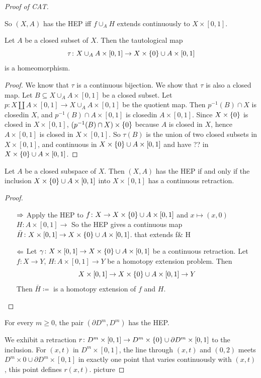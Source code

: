 \documentclass{TemplateLecture}
\begin{document}
\begin{proof}[Proof of CAT]
\begin{proposition}
        So \((X,A)\) has the HEP iff \(f\cup_A H\) extends continuously to \(X\times [0,1]\).
    \end{proposition}
    \begin{lem}
        Let \(A\) be a closed subset of \(X\). Then the tautological map
        \[\tau\colon X\cup_A A\times [0,1] \to X \times \{0\} \cup A \times [0,1]\] is a homeomorphism.
    \end{lem}
    \begin{proof}
        We know that \(\tau\) is a continuous bijection. We show that \(\tau\) is also a closed map. Let \(B\subseteq X\cup_A A\times [0,1]\) be a closed subset. Let \(p\colon X \amalg A \times [0,1] \to X \cup_A A\times [0,1]\) be the quotient map. Then \(p^{-1}(B) \cap X\) is closedin \(X\), and \(p^{-1}(B) \cap A \times[0,1]\) is closedin \(A\times [0,1]\). Since \(X\times \{0\}\) is closed in \(X\times [0,1]\), \((p^{-1}(B)\cap X) \times \{0\}\) because \(A\) is closed in \(X\), hence \(A\times [0,1]\) is closed in \(X\times [0,1]\).
        So \(\tau(B)\) is the union of two closed subsets in \(X\times [0,1]\), and continuous in \(X\times \{0\} \cup A \times [0,1]\) and have ?? in \(X\times \{0\} \cup A \times [0,1]\).
    \end{proof}
    \begin{corollary}
        Let \(A\) be a closed subspace of \(X\). Then \((X,A)\) has the HEP if and only if the inclusion \(X\times \{0\} \cup A \times [0,1]\) into \(X\times [0,1]\) has a continuous retraction.
    \end{corollary}
    \begin{proof}
        \begin{itemize}
            \item[\(\Rightarrow\)] Apply the HEP to \(f\colon X \to X\times \{0\} \cup A \times [0,1]\) and \(x \mapsto (x,0)\)
            \(H\colon A \times[0,1] \to \)%
            So the HEP gives a continuous map \(\bar H\colon X \times [0,1] \to X\times\{0\} \cup A \times [0,1]\). that extends f\& H
            \item[\(\Leftarrow\)] Let \(\gamma \colon X \times [0,1] \to X \times \{0\} \cup A \times [0,1]\) be a continuous retraction. Let \(f\colon X\to Y\), \(H\colon A \times [0,1] \to Y\) be a homotopy extension problem. Then
            \[X \times [0,1] \to X \times \{0\} \cup A \times [0,1] \to Y\]
            Then \(\bar H \coloneq \)%
            is a homotopy extension of \(f\) and \(H\).
        \end{itemize}
    \end{proof}
    \begin{proposition}
        For every \(m \geq 0\), the pair \((\partial D^m, D^m)\) has the HEP. 
    \end{proposition}
    We exhibit a retraction \(r\colon D^m \times [0,1] \to D^m \times \{0\} \cup \partial D^m \times [0,1]\) to the inclusion.
    For \((x,t) \) in \(D^m \times [0,1]\), the line through \((x,t)\) and \((0,2)\) meets \(D^m \times 0 \cup \partial D^m \times [0,1]\) in exactly one point that varies continuously with \((x,t)\), this point defines \(r(x,t)\).
    picture


\end{proof}
\end{document}
